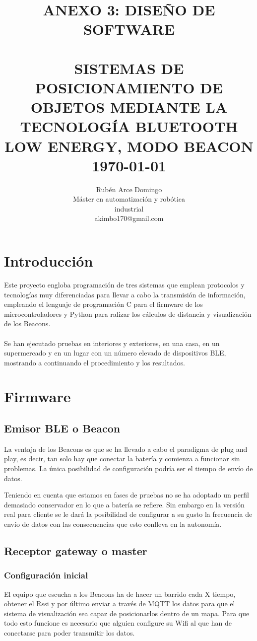 \documentclass[paper=a4, fontsize=11pt,twoside]{scrartcl}
\title{	\normalsize \textsc{ANEXO 3: DISEÑO DE SOFTWARE} 	%
		 	\\[2.0cm]								%
			\HRule{0.5pt} \\						%
			\LARGE \textbf{\uppercase{Sistemas de posicionamiento de objetos mediante la tecnología Bluetooth Low Energy, modo Beacon}}	%
			\HRule{2pt} \\ [0.5cm]		%
			\normalsize \today			%
		}
\author{
		Rubén Arce Domingo\\	
		Máster en automatización y robótica\\	
		industrial\\
		akimbo170@gmail.com\\
}
\makeatletter
\def\printtitle{%
    {\centering \@title\par}}
\def\printauthor{%
    {\centering \large \@author}}
\makeatother
\begin{document}
\thispagestyle{empty}		%
\printtitle					%
  	\vfill
\printauthor				%
\newpage
\cleardoublepage
\tableofcontents
\listoffigures
\cleardoublepage
\pagestyle{fancy}
\section{Introducción}
    Este proyecto engloba programación de tres sistemas que emplean protocolos y tecnologías muy diferenciadas para llevar a cabo 
    la transmisión de información, empleando el lenguaje de programación C para el firmware de los 
    microcontroladores y Python para ralizar los cálculos de distancia y visualización de los Beacons.
    \paragraph{}
    Se han ejecutado pruebas en interiores y exteriores, en una casa, en un supermercado y en un lugar con un número elevado 
    de dispositivos BLE, mostrando a continuando el procedimiento y los resultados.
\section{Firmware}
    \subsection{Emisor BLE o Beacon}
        La ventaja de los Beacons es que se ha llevado a cabo el paradigma de plug and play, es decir, tan solo hay que conectar la batería y comienza 
        a funcionar sin problemas. La única posibilidad de configuración podría ser el tiempo de envío de datos.
        
        Teniendo en cuenta que estamos en fases de pruebas no se ha adoptado un perfil demasiado conservador en lo que a batería se refiere. 
        Sin embargo en la versión real para cliente se le dará la posibilidad de configurar a su gusto la frecuencia de envío de datos con las consecuencias 
        que esto conlleva en la autonomía.
    \subsection{Receptor gateway o master}
        \subsubsection{Configuración inicial}
            El equipo que escucha a los Beacons ha de hacer un barrido cada X tiempo, obtener el Rssi y por último enviar a través de MQTT los datos 
            para que el sistema de visualización sea capaz de posicionarlos dentro de un mapa.
            Para que todo esto funcione es necesario que alguien configure su Wifi al que han de conectarse para poder transmitir los datos.
\end{document}
